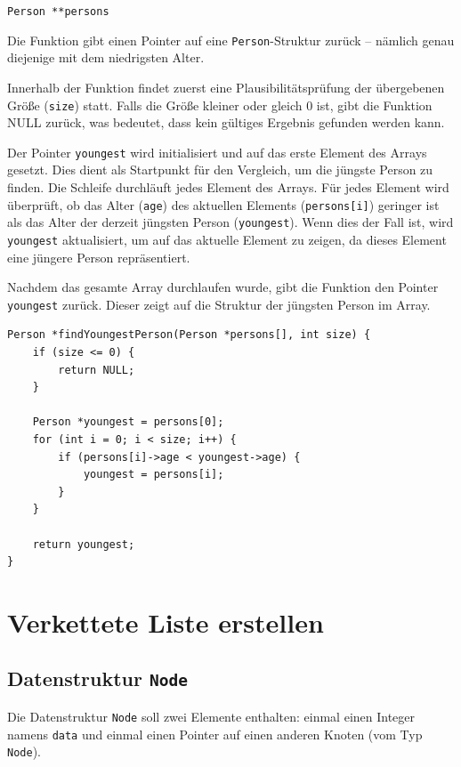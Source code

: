 \texttt{Person **persons}

Die Funktion gibt einen Pointer auf eine \texttt{Person}-Struktur zurück
-- nämlich genau diejenige mit dem niedrigsten Alter.

Innerhalb der Funktion findet zuerst eine Plausibilitätsprüfung der übergebenen
Größe (\texttt{size}) statt. Falls die Größe kleiner oder gleich 0 ist,
gibt die Funktion NULL zurück, was bedeutet, dass kein gültiges Ergebnis
gefunden werden kann.

Der Pointer \texttt{youngest} wird initialisiert und auf das erste
Element des Arrays gesetzt. Dies dient als Startpunkt für den Vergleich, um die
jüngste Person zu finden. Die Schleife durchläuft jedes Element des Arrays. Für
jedes Element wird überprüft, ob das Alter (\texttt{age}) des aktuellen
Elements (\texttt{persons[i]}) geringer ist als das Alter der derzeit
jüngsten Person (\texttt{youngest}). Wenn dies der Fall ist, wird
\texttt{youngest} aktualisiert, um auf das aktuelle Element zu zeigen, da
dieses Element eine jüngere Person repräsentiert.

Nachdem das gesamte Array durchlaufen wurde, gibt die Funktion den Pointer
\texttt{youngest} zurück. Dieser zeigt auf die Struktur der jüngsten
Person im Array.

\begin{verbatim}
Person *findYoungestPerson(Person *persons[], int size) {
    if (size <= 0) {
        return NULL;
    }

    Person *youngest = persons[0];
    for (int i = 0; i < size; i++) {
        if (persons[i]->age < youngest->age) {
            youngest = persons[i];
        }
    }

    return youngest;
}
\end{verbatim}





\chapter{Verkettete Liste erstellen}

\section*{Datenstruktur \texttt{Node}}

Die Datenstruktur \texttt{Node} soll zwei Elemente enthalten: einmal
einen Integer namens \texttt{data} und einmal einen Pointer auf einen
anderen Knoten (vom Typ \texttt{Node}).

